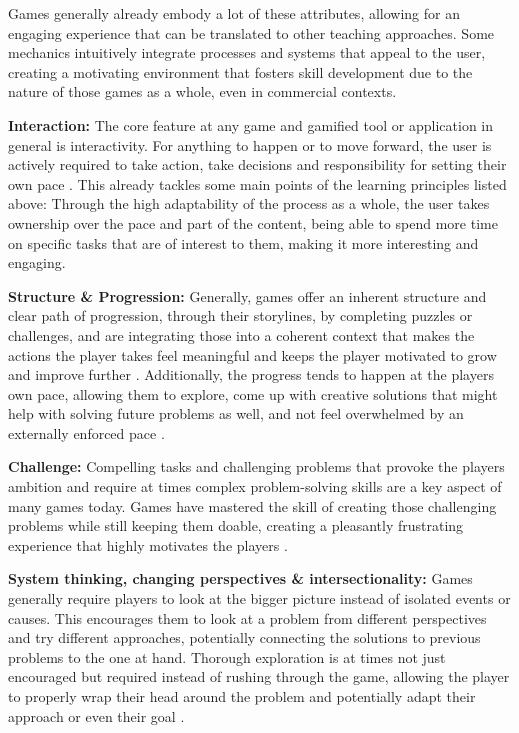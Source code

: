 Games generally already embody a lot of these attributes, allowing for an engaging experience that can be translated to other teaching approaches. Some mechanics intuitively integrate processes and systems that appeal to the user, creating a motivating environment that fosters skill development due to the nature of those games as a whole, even in commercial contexts.

\textbf{Interaction:}
The core feature at any game and gamified tool or application in general is interactivity. For anything to happen or to move forward, the user is actively required to take action, take decisions and responsibility for setting their own pace \cite{framework}. This already tackles some main points of the learning principles listed above: Through the high adaptability of the process as a whole, the user takes ownership over the pace and part of the content, being able to spend more time on specific tasks that are of interest to them, making it more interesting and engaging.

\textbf{Structure \& Progression:}
Generally, games offer an inherent structure and clear path of progression, through their storylines, by completing puzzles or challenges, and are integrating those into a coherent context that makes the actions the player takes feel meaningful and keeps the player motivated to grow and improve further \cite{framework} \cite{fail}. Additionally, the progress tends to happen at the players own pace, allowing them to explore, come up with creative solutions that might help with solving future problems as well, and not feel overwhelmed by an externally enforced pace \cite{framework}.

\textbf{Challenge:}
Compelling tasks and challenging problems that provoke the players ambition and require at times complex problem-solving skills are a key aspect of many games today. Games have mastered the skill of creating those challenging problems while still keeping them doable, creating a pleasantly frustrating experience that highly motivates the players \cite{framework}.

\textbf{System thinking, changing perspectives \& intersectionality:}
Games generally require players to look at the bigger picture instead of isolated events or causes. This encourages them to look at a problem from different perspectives and try different approaches, potentially connecting the solutions to previous problems to the one at hand. Thorough exploration is at times not just encouraged but required instead of rushing through the game, allowing the player to properly wrap their head around the problem and potentially adapt their approach or even their goal \cite{framework}.

